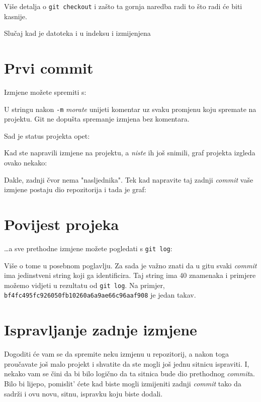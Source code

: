 Više detalja o \verb+git checkout+ i zašto ta gornja naredba radi to što radi će biti kasnije.

\TODO Slučaj kad je datoteka i u indeksu i izmijenjena

\section*{Prvi commit}

Izmjene možete spremiti s:


U stringu nakon \verb+-m+ \emph{morate} unijeti komentar uz svaku promjenu koju spremate na projektu.
Git ne dopušta spremanje izmjena bez komentara.

Sad je status projekta opet:



Kad ste napravili izmjene na projektu, a \emph{niste} ih još snimili, graf projekta izgleda ovako nekako:



Dakle, zadnji čvor nema "nasljednika".
Tek kad napravite taj zadnji \emph{commit} vaše izmjene postaju dio repozitorija i tada je graf:



\section*{Povijest projeka}

\dots{}a sve prethodne izmjene možete pogledati s \verb+git log+:



Više o tome u posebnom poglavlju. 
Za sada je važno znati da u gitu svaki \emph{commit} ima jedinstveni string koji ga identificira.
Taj string ima 40 znamenaka i primjere možemo vidjeti u rezultatu od \verb+git log+.
Na primjer, \verb+bf4fc495fc926050fb10260a6a9ae66c96aaf908+ je jedan takav.

\section*{Ispravljanje zadnje izmjene}

Dogoditi će vam se da spremite neku izmjenu u repozitorij, a nakon toga proučavate još malo projekt i shvatite da ste mogli još jednu sitnicu ispraviti.
I, nekako vam se čini da bi bilo logično da ta sitnica bude dio prethodnog \emph{commit}a.
Bilo bi lijepo, pomislit' ćete kad biste mogli izmijeniti zadnji \emph{commit} tako da sadrži i ovu novu, sitnu, ispravku koju biste dodali.

